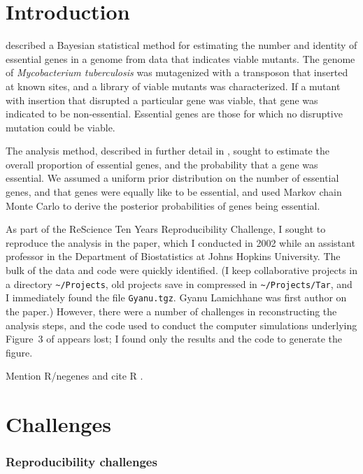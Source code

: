 \begin{quote}
\small
\articleABSTRACT
\end{quote}


\section{Introduction}

\citet{lamichhane2003} described a Bayesian statistical method for
estimating the number and identity of essential genes in a genome from
data that indicates viable mutants. The genome of \emph{Mycobacterium
tuberculosis\/} was mutagenized with a transposon that inserted at
known sites, and a library of viable mutants was characterized. If a
mutant with insertion that disrupted a particular gene was viable,
that gene was indicated to be non-essential. Essential genes are those
for which no disruptive mutation could be viable.

The analysis method, described in further detail in
\citet{blades2002}, sought to estimate the overall proportion of
essential genes, and the probability that a gene was essential. We
assumed a uniform prior distribution on the number of essential genes,
and that genes were equally like to be essential, and used Markov
chain Monte Carlo to derive the posterior probabilities of genes being
essential.

As part of the ReScience Ten Years Reproducibility Challenge, I sought
to reproduce the analysis in the paper, which I conducted in 2002
while an assistant professor in the Department of Biostatistics at
Johns Hopkins University. The bulk of the data and code were quickly
identified. (I keep collaborative projects in a directory
\verb|~/Projects|, old projects save in compressed in
\verb|~/Projects/Tar|, and I immediately found
the file \verb|Gyanu.tgz|. Gyanu Lamichhane was first author on the
paper.) However, there were a number of challenges in reconstructing
the analysis steps, and the code used to conduct the computer
simulations underlying Figure~3 of \citet{lamichhane2003} appears
lost; I found only the results and the code to generate the figure.

Mention R/negenes \citep{negenes} and cite R \citep{R}.

\section{Challenges}

\subsubsection{Reproducibility challenges}

